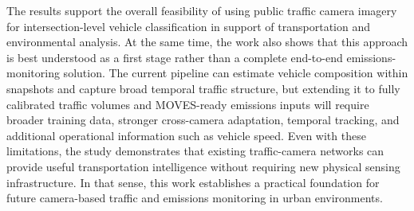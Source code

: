 The results support the overall feasibility of using public traffic 
camera imagery for intersection-level vehicle classification in support of transportation 
and environmental analysis. At the same time, the work also shows that this approach 
is best understood as a first stage rather than a complete end-to-end emissions-monitoring 
solution. The current pipeline can estimate vehicle composition within snapshots and 
capture broad temporal traffic structure, but extending it to fully calibrated traffic 
volumes and MOVES-ready emissions inputs will require broader training data, stronger 
cross-camera adaptation, temporal tracking, and additional operational information such 
as vehicle speed. Even with these limitations, the study demonstrates that existing 
traffic-camera networks can provide useful transportation intelligence without requiring 
new physical sensing infrastructure. In that sense, this work establishes a practical 
foundation for future camera-based traffic and emissions monitoring in urban environments.

